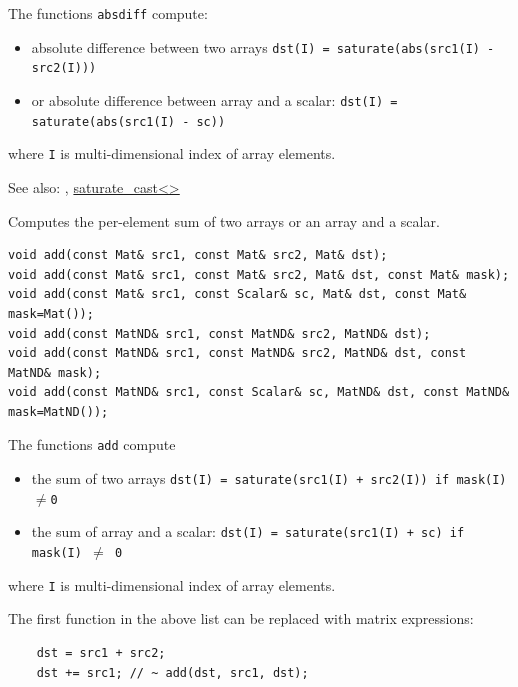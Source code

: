 The functions \texttt{absdiff} compute:
\begin{itemize}
    \item absolute difference between two arrays
    \texttt{dst(I) = saturate(abs(src1(I) - src2(I)))}
    \item or absolute difference between array and a scalar:
    \texttt{dst(I) = saturate(abs(src1(I) - sc))}
\end{itemize}
where \texttt{I} is multi-dimensional index of array elements.

See also: , \href{saturate}{saturate\_cast<>}

\label{add}
Computes the per-element sum of two arrays or an array and a scalar.

\begin{lstlisting}
void add(const Mat& src1, const Mat& src2, Mat& dst);
void add(const Mat& src1, const Mat& src2, Mat& dst, const Mat& mask);
void add(const Mat& src1, const Scalar& sc, Mat& dst, const Mat& mask=Mat());
void add(const MatND& src1, const MatND& src2, MatND& dst);
void add(const MatND& src1, const MatND& src2, MatND& dst, const MatND& mask);
void add(const MatND& src1, const Scalar& sc, MatND& dst, const MatND& mask=MatND());
\end{lstlisting}
\begin{description}
\end{description}

The functions \texttt{add} compute

\begin{itemize}
    \item the sum of two arrays
    \texttt{dst(I) = saturate(src1(I) + src2(I)) if mask(I)$\ne$0}
    \item the sum of array and a scalar:
    \texttt{dst(I) = saturate(src1(I) + sc) if mask(I) $\ne$ 0}
\end{itemize}

where \texttt{I} is multi-dimensional index of array elements.

The first function in the above list can be replaced with matrix expressions:
\begin{lstlisting}
    dst = src1 + src2;
    dst += src1; // ~ add(dst, src1, dst);
\end{lstlisting}


